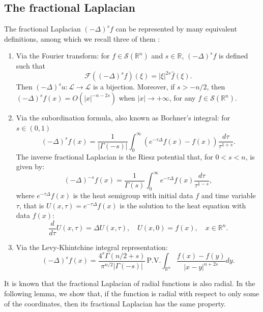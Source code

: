 \documentclass[11pt, twoside, notitlepage]{amsart}
\newcommand\R{\mathbb{R}}
\numberwithin{equation}{section}
\begin{document}
\subsection{The fractional Laplacian}  %
The fractional Laplacian $(-\Delta)^s f$ can be represented by many equivalent definitions, among which we recall three of them \cite{Bucur,Kwasnicki,Garofalo-Thoughts}:
\begin{enumerate}
\item[(i)]  Via the Fourier transform:  for $f \in \mathcal{S}(\mathbb{R}^n)$ and $s \in \mathbb{R}$, $(-\Delta)^s f $ is defined such that
    $$  \mathcal{F}( (-\Delta)^s f ) (\xi)= |\xi|^{2s} \hat{f}(\xi).$$
    Then $(-\Delta)^s u : \mathcal{L} \to \mathcal{L}$ is a bijection.
    Moreover, if $s>-n/2$, then  $(-\Delta)^s f (x)= O(|x|^{-n-2s})$ when $|x| \to +\infty$, for any $f \in \mathcal{S}(\mathbb{R}^n)$.



\item[(ii)] Via the subordination formula, also known as Bochner's integral: for $s \in (0,1) $
\begin{equation}\label{FracLapSub}
(-\Delta)^s f(x)=\frac{1}{|\Gamma(-s)|} \int_0^ \infty \left( e^ {-\tau\Delta} f(x) - f(x) \right) \frac{d\tau}{\tau^ {1+s}}.
\end{equation}
The inverse fractional Laplacian is the Riesz potential  that, for $0<s<n$,  is given by:
\begin{equation}\label{InverseFracLapSub}
(-\Delta)^{-s} f(x)=\frac{1}{\Gamma(s)} \int_0^ \infty  e^ {-\tau\Delta} f(x)  \frac{d\tau}{\tau^ {1-s}},
\end{equation}
where $e^ {-\tau\Delta} f(x)$ is the heat semigroup with initial data $f$ and time variable $\tau$, that is  $U(x, \tau)= e^ {-\tau\Delta} f(x)$ is the solution to the heat equation with data $f(x)$:
$$
\frac{d}{d\tau} U(x,\tau)=\Delta U(x,\tau), \quad  U(x,0)=f(x),\quad x\in \R^n.
$$
\item[(iii)] Via the Levy-Khintchine integral representation:
\begin{equation}\label{def:fractLap}
(-\Delta)^s f(x)=  \frac{4^s \Gamma(n/2+s)}{\pi^{n/2} |\Gamma(-s)|}\,  \text{P.V.} \int_{\R^n} \frac{f(x)-f(y)}{|x-y|^{n+2s}}dy.
\end{equation}
\end{enumerate}
It is known that the fractional Laplacian of radial functions is also radial. In the following lemma, we show that, if the function is radial with respect to only some of the coordinates, then its fractional Laplacian has the same property.
\end{document}
